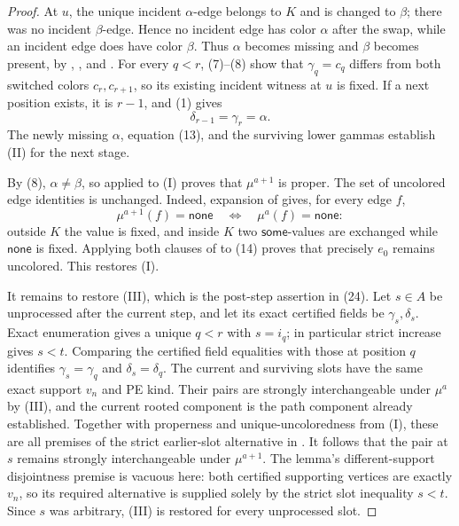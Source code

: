 \begin{proof}
At \(u\), the unique incident \(\alpha\)-edge belongs to \(K\) and is
changed to \(\beta\); there was no incident \(\beta\)-edge.  Hence no
incident edge has color \(\alpha\) after the swap, while an incident edge
does have color \(\beta\).  Thus \(\alpha\) becomes missing and
\(\beta\) becomes present, by ,
, and .  For every
\(q<r\), (7)--(8) show that \(\gamma_q=c_q\) differs from both switched
colors \(c_r,c_{r+1}\), so its existing incident witness at \(u\) is
fixed.  If a next position exists, it is \(r-1\), and (1) gives
\[
                  \delta_{r-1}=\gamma_r=\alpha.              \tag{13}
\]
The newly missing \(\alpha\), equation (13), and the surviving lower
gammas establish (II) for the next stage.

By (8), \(\alpha\ne\beta\), so
 applied to (I) proves that
\(\mu^{a+1}\) is proper.  The set of uncolored edge identities is
unchanged.  Indeed, expansion of
 gives, for every edge \(f\),
\[
 \mu^{a+1}(f)=\mathsf{none}\quad\Longleftrightarrow\quad
 \mu^a(f)=\mathsf{none}:                                    \tag{14}
\]
outside \(K\) the value is fixed, and inside \(K\) two
\(\mathsf{some}\)-values are exchanged while \(\mathsf{none}\) is
fixed.  Applying both clauses of  to (14)
proves that precisely \(e_0\) remains uncolored.  This restores (I).

It remains to restore (III), which is the post-step assertion in (24).
Let \(s\in A\) be unprocessed after the current step, and let its exact
certified fields be \(\gamma_s,\delta_s\).  Exact enumeration gives a
unique \(q<r\) with \(s=i_q\); in particular strict increase gives
\(s<t\).  Comparing the certified field equalities with those at
position \(q\) identifies
\(\gamma_s=\gamma_q\) and \(\delta_s=\delta_q\).  The current and
surviving slots have the same exact support \(v_n\) and PE kind.  Their
pairs are strongly interchangeable under \(\mu^a\) by (III), and the
current rooted component is the path component already established.
Together with properness and unique-uncoloredness from (I), these are
all premises of the strict earlier-slot alternative in
.  It follows that the
pair at \(s\) remains strongly interchangeable under \(\mu^{a+1}\).
The lemma's different-support disjointness premise is vacuous here:
both certified supporting vertices are exactly \(v_n\), so its required
alternative is supplied solely by the strict slot inequality \(s<t\).
Since \(s\) was arbitrary, (III) is restored for every unprocessed slot.


\end{proof}

